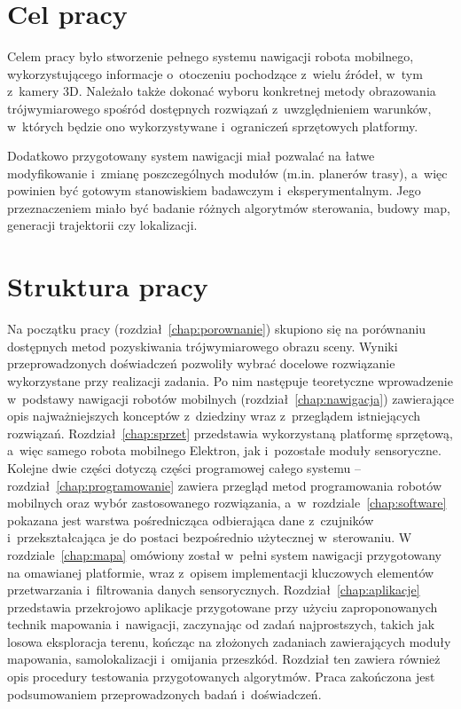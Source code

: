 \section{Cel pracy}

Celem pracy było stworzenie pełnego systemu nawigacji robota mobilnego,
wykorzystującego informacje o~otoczeniu pochodzące z~wielu źródeł, w~tym z~kamery 3D.
Należało także dokonać wyboru konkretnej metody obrazowania trójwymiarowego
spośród dostępnych rozwiązań z~uwzględnieniem warunków, w~których będzie ono
wykorzystywane i~ograniczeń sprzętowych platformy.

Dodatkowo przygotowany system nawigacji miał pozwalać na łatwe modyfikowanie
i~zmianę poszczególnych modułów (m.in. planerów trasy), a~więc powinien być
gotowym stanowiskiem badawczym i~eksperymentalnym. Jego przeznaczeniem miało
być badanie różnych algorytmów sterowania, budowy map, generacji trajektorii czy lokalizacji.


\section{Struktura pracy}

Na początku pracy (rozdział~\ref{chap:porownanie}) skupiono się na porównaniu
dostępnych metod pozyskiwania trójwymiarowego
obrazu sceny. Wyniki przeprowadzonych doświadczeń pozwoliły wybrać docelowe rozwiązanie
wykorzystane przy realizacji zadania. Po nim następuje
teoretyczne wprowadzenie w~podstawy nawigacji robotów mobilnych (rozdział~\ref{chap:nawigacja})
zawierające opis najważniejszych konceptów z~dziedziny wraz z~przeglądem istniejących
rozwiązań. Rozdział~\ref{chap:sprzet} przedstawia wykorzystaną platformę sprzętową,
a~więc samego robota mobilnego Elektron, jak i~pozostałe moduły sensoryczne. Kolejne
dwie części dotyczą części programowej całego systemu -- rozdział~\ref{chap:programowanie}
zawiera przegląd metod programowania robotów mobilnych oraz wybór zastosowanego rozwiązania,
a~w~rozdziale~\ref{chap:software} pokazana jest warstwa pośrednicząca odbierająca
dane z~czujników i~przekształcająca je do postaci bezpośrednio użytecznej w~sterowaniu.
W rozdziale~\ref{chap:mapa} omówiony został w~pełni system nawigacji przygotowany
na omawianej platformie, wraz z~opisem implementacji kluczowych elementów
przetwarzania i~filtrowania danych sensorycznych.
Rozdział~\ref{chap:aplikacje} przedstawia przekrojowo aplikacje przygotowane
przy użyciu zaproponowanych technik mapowania i~nawigacji, zaczynając od zadań
najprostszych, takich jak losowa eksploracja terenu, kończąc na złożonych zadaniach
zawierających moduły mapowania, samolokalizacji i~omijania przeszkód. Rozdział ten
zawiera również opis procedury testowania przygotowanych algorytmów. Praca zakończona
jest podsumowaniem przeprowadzonych badań i~doświadczeń.


